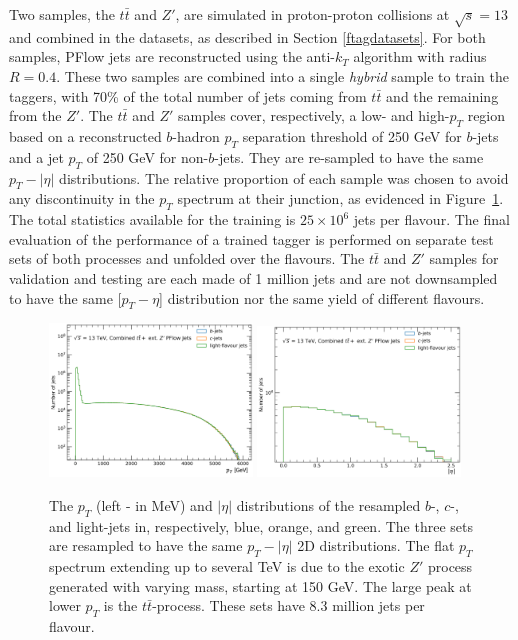 Two samples, the $t\bar{t}$ and $Z'$, are simulated in proton-proton collisions at $\sqrt{s} = 13$ and combined in the datasets, as described in Section \ref{ftagdatasets}. For both samples, PFlow jets are reconstructed using the anti-$k_T$ algorithm with radius $R = 0.4$. These two samples are combined into a single \textit{hybrid} sample to train the taggers, with 70\% of the total number of jets coming from $t\bar{t}$ and the remaining from the $Z'$. The $t\bar{t}$ and $Z'$ samples cover, respectively, a low- and high-$p_T$ region based on a reconstructed $b$-hadron $p_T$ separation threshold of 250 GeV for $b$-jets and a jet $p_T$ of 250 GeV for non-$b$-jets. They are re-sampled to have the same $p_T-|\eta|$ distributions. The relative proportion of each sample was chosen to avoid any discontinuity in the $p_T$ spectrum at their junction, as evidenced in Figure~\ref{fig:distTraining}. The total statistics available for the training is $25 \times 10^{6}$ jets per flavour. The final evaluation of the performance of a trained tagger is performed on separate test sets of both processes and unfolded over the flavours. The $t\bar{t}$ and $Z'$ samples for validation and testing are each made of 1 million jets and are not downsampled to have the same [$p_T - \eta$] distribution nor the same yield of different flavours. \\

\begin{figure}[h!]
  \center
  \includegraphics[width=0.48\textwidth]{Images/FTAG/DL1d/ptdist.png}
  \includegraphics[width=0.48\textwidth]{Images/FTAG/DL1d/etadist.png}
  \caption{The $p_T$ (left - in MeV) and $|\eta|$ distributions of the resampled $b$-, $c$-, and light-jets in, respectively, blue, orange, and green. The three sets are resampled to have the same $p_T-|\eta|$ 2D distributions. The flat $p_T$ spectrum extending up to several TeV is due to the exotic $Z'$ process generated with varying mass, starting at 150 GeV. The large peak at lower $p_T$ is the $t\bar{t}$-process. These sets have 8.3 million jets per flavour.} 
  \label{fig:distTraining}
\end{figure}

